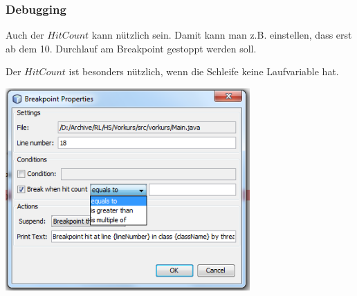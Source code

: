 \documentclass[final]{beamer}
\begin{document}
\begin{frame}
  \frametitle{Debugging}
  Auch der $Hit Count$ kann nützlich sein. Damit kann man z.B. einstellen, dass erst
  ab dem 10. Durchlauf am Breakpoint gestoppt werden soll.

  Der $Hit Count$ ist besonders nützlich, wenn die Schleife keine Laufvariable hat.

  \begin{center}
  \includegraphics[width=0.7\textwidth]{breakpoint_hitcount}
  \end{center}
\end{frame}
\end{document}

